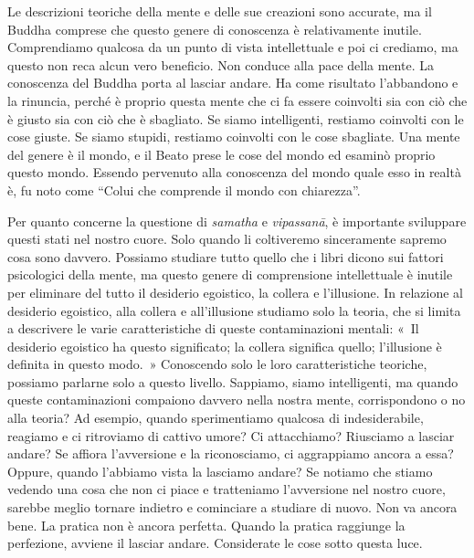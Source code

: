 Le descrizioni teoriche della mente e delle sue creazioni sono accurate,
ma il Buddha comprese che questo genere di conoscenza è relativamente
inutile. Comprendiamo qualcosa da un punto di vista intellettuale e poi
ci crediamo, ma questo non reca alcun vero beneficio. Non conduce alla
pace della mente. La conoscenza del Buddha porta al lasciar andare. Ha
come risultato l'abbandono e la rinuncia, perché è proprio questa mente
che ci fa essere coinvolti sia con ciò che è giusto sia con ciò che è
sbagliato. Se siamo intelligenti, restiamo coinvolti con le cose giuste.
Se siamo stupidi, restiamo coinvolti con le cose sbagliate. Una mente
del genere è il mondo, e il Beato prese le cose del mondo ed esaminò
proprio questo mondo. Essendo pervenuto alla conoscenza del mondo quale
esso in realtà è, fu noto come ``Colui che comprende il mondo con
chiarezza''.

Per quanto concerne la questione di \emph{samatha} e \emph{vipassanā}, è
importante sviluppare questi stati nel nostro cuore. Solo quando li
coltiveremo sinceramente sapremo cosa sono davvero. Possiamo studiare
tutto quello che i libri dicono sui fattori psicologici della mente, ma
questo genere di comprensione intellettuale è inutile per eliminare del
tutto il desiderio egoistico, la collera e l'illusione. In relazione al
desiderio egoistico, alla collera e all'illusione studiamo solo la
teoria, che si limita a descrivere le varie caratteristiche di queste
contaminazioni mentali: «~Il desiderio egoistico ha questo significato;
la collera significa quello; l'illusione è definita in questo modo.~»
Conoscendo solo le loro caratteristiche teoriche, possiamo parlarne solo
a questo livello. Sappiamo, siamo intelligenti, ma quando queste
contaminazioni compaiono davvero nella nostra mente, corrispondono o no
alla teoria? Ad esempio, quando sperimentiamo qualcosa di
indesiderabile, reagiamo e ci ritroviamo di cattivo umore? Ci
attacchiamo? Riusciamo a lasciar andare? Se affiora l'avversione e la
riconosciamo, ci aggrappiamo ancora a essa? Oppure, quando l'abbiamo
vista la lasciamo andare? Se notiamo che stiamo vedendo una cosa che non
ci piace e tratteniamo l'avversione nel nostro cuore, sarebbe meglio
tornare indietro e cominciare a studiare di nuovo. Non va ancora bene.
La pratica non è ancora perfetta. Quando la pratica raggiunge la
perfezione, avviene il lasciar andare. Considerate le cose sotto questa
luce.

